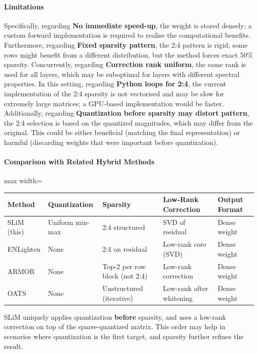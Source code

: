 \paragraph{Limitations}

Specifically, regarding \textbf{No immediate speed-up}, the weight is stored densely; a custom forward implementation is required to realise the computational benefits. Furthermore, regarding \textbf{Fixed sparsity pattern}, the 2:4 pattern is rigid; some rows might benefit from a different distribution, but the method forces exact 50\% sparsity. Concurrently, regarding \textbf{Correction rank uniform}, the same rank is used for all layers, which may be suboptimal for layers with different spectral properties. In this setting, regarding \textbf{Python loops for 2:4}, the current implementation of the 2:4 sparsity is not vectorised and may be slow for extremely large matrices; a GPU-based implementation would be faster. Additionally, regarding \textbf{Quantization before sparsity may distort pattern}, the 2:4 selection is based on the quantized magnitudes, which may differ from the original. This could be either beneficial (matching the final representation) or harmful (discarding weights that were important before quantization).


\paragraph{Comparison with Related Hybrid Methods}

\begin{center}
\begin{adjustbox}{max width=\columnwidth}
\renewcommand{\arraystretch}{1.2}
\begin{tabular}{lllll}
\toprule
Method & Quantization & Sparsity & Low-Rank Correction & Output Format \\
\midrule
SLiM (this) & Uniform min-max & 2:4 structured & SVD of residual & Dense weight \\
ENLighten & None & 2:4 on residual & Low-rank core (SVD) & Dense weight \\
ARMOR & None & Top-2 per row block (not 2:4) & Low-rank correction & Dense weight \\
OATS & None & Unstructured (iterative) & Low-rank after whitening & Dense weight \\

\bottomrule
\end{tabular}
\end{adjustbox}
\end{center}
SLiM uniquely applies quantization \textbf{before} sparsity, and uses a low-rank correction on top of the sparse-quantized matrix. This order may help in scenarios where quantization is the first target, and sparsity further refines the result.


